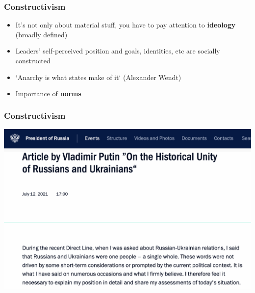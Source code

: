 \documentclass[aspectratio=43]{beamer}
\begin{document}
\begin{frame}
\frametitle{Constructivism}
\centering

\begin{itemize}
  \item<1-> It's not only about material stuff, you have to pay attention to \textbf{ideology} (broadly defined)
  \item<2-> Leaders' self-perceived position and goals, identities, etc are socially constructed
  \item<2-> `Anarchy is what states make of it` (Alexander Wendt)
  \item<3-> Importance of \textbf{norms}
\end{itemize}

\end{frame}

\begin{frame}
\frametitle{Constructivism}
\centering

\includegraphics[width = \textwidth]{img/putin_historical_unity}

\end{frame}
\end{document}
